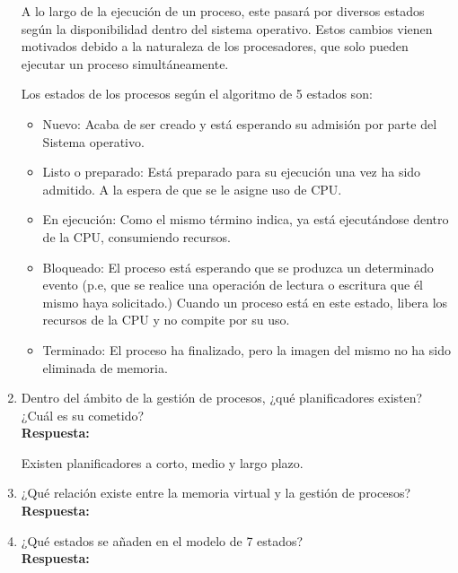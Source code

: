 \documentclass[a4paper,12pt]{article}
\begin{document}
\begin{enumerate}[label=\textbf{Pregunta \arabic*.}]
    A lo largo de la ejecución de un proceso, este pasará por diversos estados según la disponibilidad dentro del sistema operativo. Estos cambios vienen motivados debido a la naturaleza de los procesadores, que solo pueden ejecutar un proceso simultáneamente.

    Los estados de los procesos según el algoritmo de 5 estados son:

    \begin{itemize}
    
    \item Nuevo: Acaba de ser creado y está esperando su admisión por parte del Sistema operativo.

    \item Listo o preparado: Está preparado para su ejecución una vez ha sido admitido. A la espera de que se le asigne uso de CPU.

    \item En ejecución: Como el mismo término indica, ya está ejecutándose dentro de la CPU, consumiendo recursos. 

    \item Bloqueado: El proceso está esperando que se produzca un determinado evento (p.e, que se realice una operación de lectura o escritura que él mismo haya solicitado.) Cuando un proceso está en este estado, libera los recursos de la CPU y no compite por su uso.

    \item Terminado: El proceso ha finalizado, pero la imagen del mismo no ha sido eliminada de memoria.

    \end{itemize}

    \item Dentro del ámbito de la gestión de procesos, ¿qué planificadores existen? ¿Cuál es su cometido? \\ %
    \textbf{Respuesta:} 
    
    Existen planificadores a corto, medio y largo plazo.


    \item ¿Qué relación existe entre la memoria virtual y la gestión de procesos? \\ %
    \textbf{Respuesta:} 
    
    

    \item ¿Qué estados se añaden en el modelo de 7 estados? \\ %
    \textbf{Respuesta:}
    

\end{enumerate}
\end{document}
